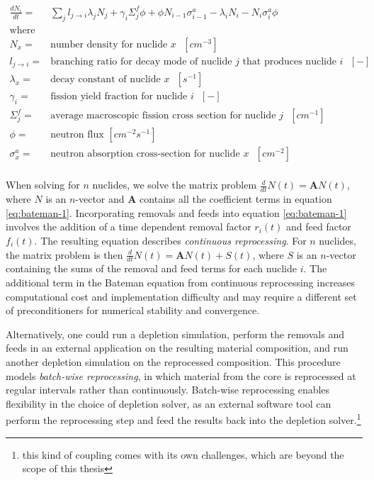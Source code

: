 \begin{align}
    \label{eq:bateman-1}
    \frac{dN_{i}}{dt} =& \sum_{j} l_{j\to i}\lambda_{j} N_{j} + \gamma_{i} \Sigma^{f}_{j}\phi + \phi N_{i-1} \sigma^{a}_{i-1} - \lambda_{i}N_{i} - N_{i}\sigma^{a}_{i}\phi\\
    \text{where} & \nonumber \\
    N_{x} =& \text{number density for nuclide $x$ $[cm^{-3}]$}\nonumber\\
    l_{j\to i} =& \text{branching ratio for decay mode of nuclide $j$ that produces nuclide $i$ $[-]$}\nonumber\\
    \lambda_{x} =& \text{decay constant of nuclide $x$ $[s^{-1}]$}\nonumber\\
    \gamma_{i} =& \text{fission yield fraction for nuclide $i$ $[-]$}\nonumber \\
    \Sigma^{f}_{j} =& \text{average macroscopic fission cross section for nuclide $j$ $[cm^{-1}]$}\nonumber\\
    \phi =& \text{neutron flux $[cm^{-2}s^{-1}]$}\nonumber\\
    \sigma^{a}_{x} =& \text{neutron absorption cross-section for nuclide $x$ $[cm^{-2}]$}\nonumber\\
\end{align}
    
When solving for $n$ nuclides, we solve the matrix problem
$\frac{d}{dt}N(t) = \mathbf{A}N(t)$, where $N$ is an $n$-vector and
$\mathbf{A}$ contains all the coefficient terms in equation \ref{eq:bateman-1}.
Incorporating removals and feeds into equation \ref{eq:bateman-1} involves the
addition of a time dependent removal factor $r_{i}(t)$ and feed factor
$f_{i}(t)$. The resulting equation describes {\it continuous reprocessing}.
For $n$ nuclides, the matrix problem is then
$\frac{d}{dt}N(t) = \mathbf{A}N(t) + S(t)$, where $S$ is an $n$-vector
containing the sums of the removal and feed terms for each nuclide $i$. The
additional term in the Bateman equation from continuous reprocessing increases
computational cost and implementation difficulty and may require a different
set of preconditioners for numerical stability and convergence.

Alternatively, one could run a depletion simulation, perform the removals and
feeds in an external application on the resulting material composition, and run
another depletion simulation on the reprocessed composition. This procedure
models {\it batch-wise reprocessing}, in which material from the core is
reprocessed at regular intervals rather than continuously. Batch-wise
reprocessing enables flexibility in the choice of depletion solver, as an
external software tool can perform the reprocessing step and feed the results
back into the depletion solver.\footnote{this kind of coupling comes with its
own challenges, which are beyond the scope of this thesis}

